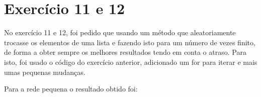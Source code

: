 \documentclass[pdftex,12pt,a4paper]{report}
\begin{document}


\section{Exercício 11 e 12}

No exercício 11 e 12, foi pedido que usando um método que aleatoriamente trocasse os elementos de uma lista e fazendo isto para um número de vezes finito, de forma a obter sempre os melhores resultados tendo em conta o atraso. Para isto, foi usado o código do exercício anterior, adicionado um for para iterar e mais umas pequenas mudanças.

Para a rede pequena o resultado obtido foi:





\newpage
\end{document}
